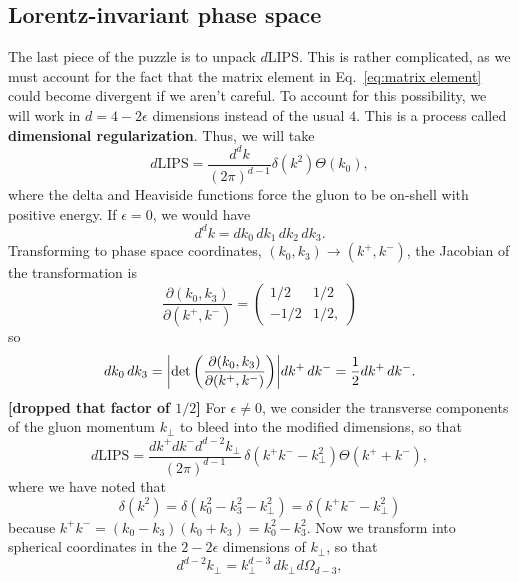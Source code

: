 \documentclass[11pt,twoside,reqno]{amsart}
\theoremstyle{plain}
\theoremstyle{remark}
\theoremstyle{definition}
\theoremstyle{remark}
\theoremstyle{definition}
\theoremstyle{definition}
\newcommand{\LIPS}{\mathrm{LIPS}}
\begin{document}
\subsection{Lorentz-invariant phase space}
	The last piece of the puzzle is to unpack $d\LIPS$. This is rather complicated, as we must account for the fact that the matrix element in Eq.\ \ref{eq:matrix element} could become divergent if we aren't careful. To account for this possibility, we will work in $d = 4 - 2\epsilon$ dimensions instead of the usual $4$. This is a process called \textbf{dimensional regularization}. Thus, we will take
	\begin{equation}
		d\LIPS = \frac{d^d k}{(2\pi)^{d - 1}} \delta(k^2) \Theta(k_0),
	\end{equation}
	where the delta and Heaviside functions force the gluon to be on-shell with positive energy. If $\epsilon = 0$, we would have
	\begin{equation}
		d^d k = dk_0\,dk_1\,dk_2\,dk_3.
	\end{equation}
	Transforming to phase space coordinates, $(k_0, k_3) \to (k^+, k^-)$, the Jacobian of the transformation is
	\begin{equation}
		\frac{\partial(k_0, k_3)}{\partial(k^+, k^-)} = \begin{pmatrix}
			1/2 & 1/2 \\ -1/2 & 1/2,
		\end{pmatrix}
	\end{equation}
	so
	\begin{equation}
		dk_0\,dk_3 = \abs{\det\qty(\frac{\partial(k_0, k_3)}{\partial(k^+, k^-)})} dk^+\,dk^- = \frac{1}{2}dk^+\,dk^-.
	\end{equation}
	{\color{red}\textbf{[dropped that factor of $1/2$]}} For $\epsilon \neq 0$, we consider the transverse components of the gluon momentum $k_\perp$ to bleed into the modified dimensions, so that
	\begin{equation}
		d\LIPS = \frac{dk^+ dk^- d^{d - 2}k_\perp}{(2\pi)^{d - 1}}\,\delta(k^+ k^- - k_\perp^2)\Theta(k^+ + k^-),
	\end{equation}
	where we have noted that
	\begin{equation}
		\delta(k^2) = \delta(k_0^2 - k_3^2 - k_\perp^2) = \delta(k^+ k^- - k_\perp^2)
	\end{equation}
	because $k^+ k^- = (k_0 - k_3)(k_0 + k_3) = k_0^2  - k_3^2$. Now we transform into spherical coordinates in the $2 - 2\epsilon$ dimensions of $k_\perp$, so that
	\begin{equation}
		d^{d - 2} k_\perp = k_\perp^{d - 3} \, dk_\perp d\Omega_{d - 3},
	\end{equation}
\end{document}
